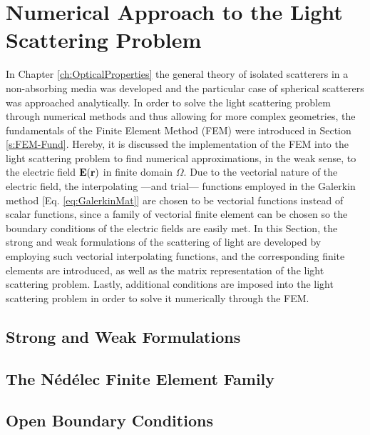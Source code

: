 \documentclass[11pt]{Latex/Classes/PhDthesisPSnPDF}
\begin{document}
    \section{Numerical Approach to the Light Scattering Problem}
     \label{s:Scat-FEM}

    In Chapter \ref{ch:OpticalProperties} the general theory of isolated scatterers in a non-absorbing media was developed and the particular case of spherical scatterers was approached analytically. In order to solve the light scattering problem through numerical methods and thus allowing for more complex geometries, the fundamentals of the Finite Element Method (FEM) were introduced in Section \ref{s:FEM-Fund}. Hereby, it is discussed the implementation of the FEM into the light scattering problem to find numerical approximations, in the weak sense, to the  electric field $\vb{E}(\vb{r})$ in finite domain $\Omega$. Due to the vectorial nature of the electric field, the interpolating ---and trial--- functions employed in the Galerkin method [Eq. \eqref{eq:GalerkinMat}] are chosen to be vectorial functions instead of scalar functions, since a family of vectorial finite element can be chosen so the boundary conditions of the electric fields are easily met. In this Section, the strong and weak formulations of the scattering of light are developed by employing such vectorial interpolating functions, and the corresponding finite elements are introduced, as well as the matrix representation of the light scattering problem. Lastly, additional conditions are imposed into the light scattering problem in order to solve it numerically through the FEM.

        \subsection{Strong and Weak Formulations}
         \label{ss:Scat-Form}
         

         \subsection{The Nédélec Finite Element Family}
          \label{ss:Nedelec}
         

        \subsection{Open Boundary Conditions }
         \label{ss:Sommerfeld-PML}
\end{document}
